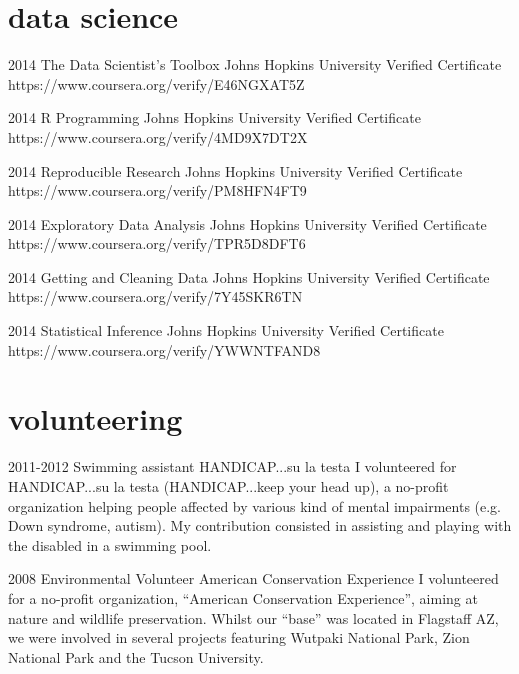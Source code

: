 \documentclass[]{friggeri-cv} %
\begin{document}
\section{data science}
\begin{entrylist}
\entry
{2014}
{The Data Scientist’s Toolbox}
{Johns Hopkins University}
{Verified Certificate https://www.coursera.org/verify/E46NGXAT5Z}

\entry
{2014}
{R Programming}
{Johns Hopkins University}
{Verified Certificate https://www.coursera.org/verify/4MD9X7DT2X}

\entry
{2014}
{Reproducible Research}
{Johns Hopkins University}
{Verified Certificate https://www.coursera.org/verify/PM8HFN4FT9}

\entry
{2014}
{Exploratory Data Analysis}
{Johns Hopkins University}
{Verified Certificate https://www.coursera.org/verify/TPR5D8DFT6}

\entry
{2014}
{Getting and Cleaning Data}
{Johns Hopkins University}
{Verified Certificate https://www.coursera.org/verify/7Y45SKR6TN}

\entry
{2014}
{Statistical Inference}
{Johns Hopkins University}
{Verified Certificate https://www.coursera.org/verify/YWWNTFAND8}
\end{entrylist}


\section{volunteering}
\begin{entrylist}
\entry
{2011-2012}
{Swimming assistant}
{HANDICAP...su la testa}
{
    I volunteered for HANDICAP...su la testa (HANDICAP...keep your head up), a no-profit
    organization helping people affected by various kind of mental impairments (e.g. Down syndrome, autism). My contribution consisted in assisting and playing with the disabled in a swimming pool.
}

\entry
{2008}
{Environmental Volunteer}
{American Conservation Experience}
{
    I volunteered for a no-profit organization, ``American Conservation Experience'', aiming at nature
    and wildlife preservation. Whilst our ``base'' was located in Flagstaff AZ, we were involved in
    several projects featuring Wutpaki National Park, Zion National Park and the Tucson University.
}
\end{entrylist}
\end{document}
